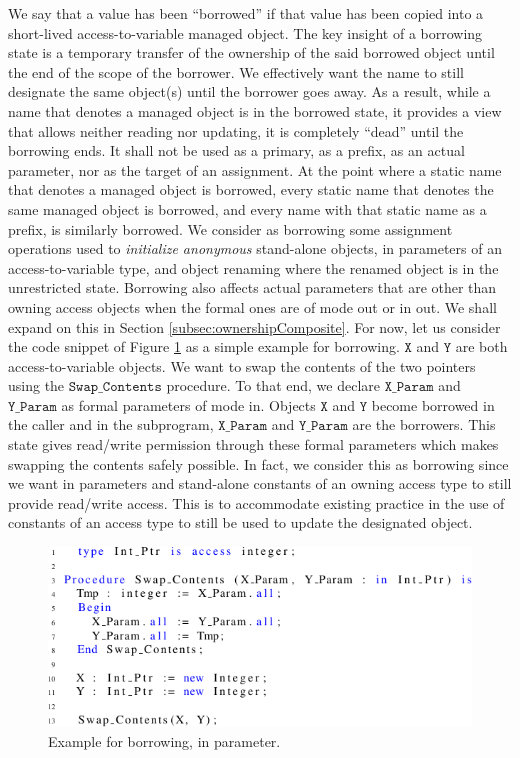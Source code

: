 \documentclass{llncs}
\newcommand\var[1]{\ensuremath{\mathtt{#1}}}
\newcommand{\keyword}[1]{\textsf{#1}}
\begin{document}
We say that a value has been ``borrowed'' if that value has been copied into a short-lived access-to-variable managed object.
The key insight of a borrowing state is a temporary transfer of the ownership of the said borrowed object until the end of the scope of the borrower.
We effectively want the name to still designate the same object(s) until the borrower goes away. As a result, while a name that denotes a managed object
is in the borrowed state, it provides a view that allows neither reading nor updating, it is completely ``dead'' until the borrowing ends. It shall not
be used as a primary, as a prefix, as an actual parameter, nor as the target of an assignment. At the point where a static name that denotes a managed
object is borrowed, every static name that denotes the same managed object is borrowed, and every name with that static name as a prefix, is similarly borrowed.
We consider as borrowing some assignment operations used to \textit{initialize anonymous} stand-alone objects, \keyword{in} parameters of an access-to-variable
type, and object renaming where the renamed object is in the unrestricted state. Borrowing also affects actual parameters that are other than owning access objects
when the formal ones are of mode \keyword{out} or \keyword{in out}. We shall expand on this in Section \ref{subsec:ownershipComposite}. For now, let us consider the
code snippet of Figure \ref{fig:borrow_ex1} as a simple example for borrowing. \var{X} and \var{Y} are both access-to-variable objects. We want to swap the contents of the two
pointers using the \var{Swap\_Contents} procedure. To that end, we declare \var{X\_Param} and \var{Y\_Param} as formal parameters of mode \keyword{in}. Objects \var{X} and \var{Y} become borrowed
in the caller and in the subprogram, \var{X\_Param} and \var{Y\_Param} are the borrowers. This state gives read/write permission through these formal parameters which makes swapping
the contents safely possible. In fact, we consider this as borrowing since we want \keyword{in} parameters and stand-alone constants of an owning access type to still
provide read/write access. This is to accommodate existing practice in the use of constants of an access type to still be used to update the designated object.

\begin{figure}[htb!]
\centering
   \includegraphics[]{borrow_ex1}
   \caption{Example for borrowing, \keyword{in} parameter.}
   \label{fig:borrow_ex1}
\end{figure}
\end{document}
